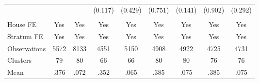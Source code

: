 {\begin{tabular}{l*{8}{c}}
                &         &         &  (0.117)&  (0.429)&  (0.751)&  (0.141)&  (0.902)&  (0.292)\\
                &         &         &         &         &         &         &         &         \\
House FE        &      Yes&      Yes&      Yes&      Yes&      Yes&      Yes&      Yes&      Yes\\
Stratum FE      &      Yes&      Yes&      Yes&      Yes&      Yes&      Yes&      Yes&      Yes\\
\midrule
Observations    &     5572&     8133&     4551&     5150&     4908&     4922&     4725&     4731\\
Clusters        &       79&       80&       66&       66&       80&       80&       76&       76\\
Mean            &     .376&     .072&     .352&     .065&     .385&     .075&     .385&     .075\\
\bottomrule
\end{tabular}
}
